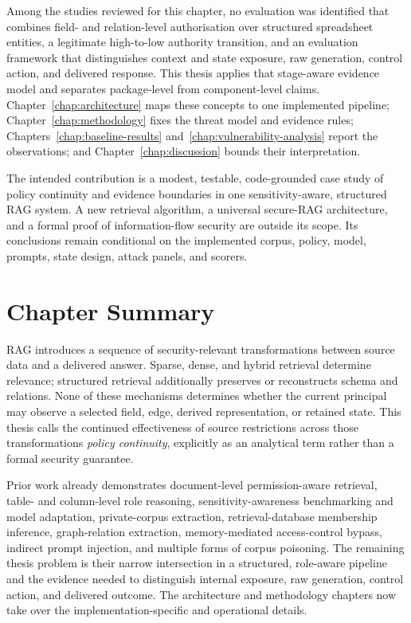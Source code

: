 Among the studies reviewed for this chapter, no evaluation was identified that combines field- and relation-level authorisation over structured spreadsheet entities, a legitimate high-to-low authority transition, and an evaluation framework that distinguishes context and state exposure, raw generation, control action, and delivered response. This thesis applies that stage-aware evidence model and separates package-level from component-level claims. Chapter~\ref{chap:architecture} maps these concepts to one implemented pipeline; Chapter~\ref{chap:methodology} fixes the threat model and evidence rules; Chapters~\ref{chap:baseline-results} and~\ref{chap:vulnerability-analysis} report the observations; and Chapter~\ref{chap:discussion} bounds their interpretation.

The intended contribution is a modest, testable, code-grounded case study of policy continuity and evidence boundaries in one sensitivity-aware, structured RAG system. A new retrieval algorithm, a universal secure-RAG architecture, and a formal proof of information-flow security are outside its scope. Its conclusions remain conditional on the implemented corpus, policy, model, prompts, state design, attack panels, and scorers.

\section{Chapter Summary}

RAG introduces a sequence of security-relevant transformations between source data and a delivered answer. Sparse, dense, and hybrid retrieval determine relevance; structured retrieval additionally preserves or reconstructs schema and relations. None of these mechanisms determines whether the current principal may observe a selected field, edge, derived representation, or retained state. This thesis calls the continued effectiveness of source restrictions across those transformations \emph{policy continuity}, explicitly as an analytical term rather than a formal security guarantee.

Prior work already demonstrates document-level permission-aware retrieval, table- and column-level role reasoning, sensitivity-awareness benchmarking and model adaptation, private-corpus extraction, retrieval-database membership inference, graph-relation extraction, memory-mediated access-control bypass, indirect prompt injection, and multiple forms of corpus poisoning. The remaining thesis problem is their narrow intersection in a structured, role-aware pipeline and the evidence needed to distinguish internal exposure, raw generation, control action, and delivered outcome. The architecture and methodology chapters now take over the implementation-specific and operational details.
